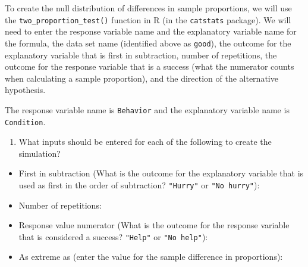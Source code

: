 \documentclass[
]{report}
\providecommand{\tightlist}{%
  \setlength{\itemsep}{0pt}\setlength{\parskip}{0pt}}
\begin{document}
\vspace{1in}

To create the null distribution of differences in sample proportions, we will use the \texttt{two\_proportion\_test()} function in R (in the \texttt{catstats} package). We will need to enter the response variable name and the explanatory variable name for the formula, the data set name (identified above as \texttt{good}), the outcome for the explanatory variable that is first in subtraction, number of repetitions, the outcome for the response variable that is a success (what the numerator counts when calculating a sample proportion), and the direction of the alternative hypothesis.

The response variable name is \texttt{Behavior} and the explanatory variable name is \texttt{Condition}.

\begin{enumerate}
\def\labelenumi{\arabic{enumi}.}
\setcounter{enumi}{1}
\tightlist
\item
  What inputs should be entered for each of the following to create the simulation?
  \vspace{1mm}
\end{enumerate}

\begin{itemize}
\tightlist
\item
  First in subtraction (What is the outcome for the explanatory variable that is used as first in the order of subtraction? \texttt{"Hurry"} or \texttt{"No\ hurry"}):
\end{itemize}

\vspace{.15in}

\begin{itemize}
\tightlist
\item
  Number of repetitions:
\end{itemize}

\vspace{.15in}

\begin{itemize}
\tightlist
\item
  Response value numerator (What is the outcome for the response variable that is considered a success? \texttt{"Help"} or \texttt{"No\ help"}):
\end{itemize}

\vspace{.15in}

\begin{itemize}
\tightlist
\item
  As extreme as (enter the value for the sample difference in proportions):
\end{itemize}
\end{document}

